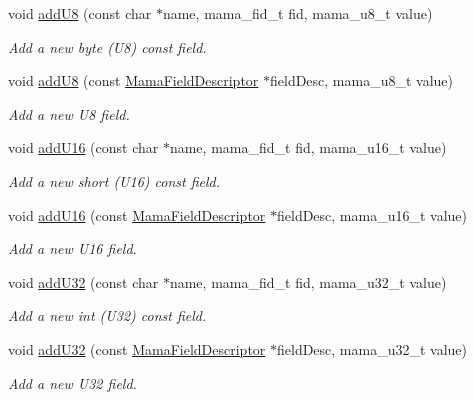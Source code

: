 \begin{DoxyCompactItemize}
void \hyperlink{classWombat_1_1MamaMsg_a931fb98ca16997dd63ecdc4438ff5708}{addU8} (const char $\ast$name, mama\_\-fid\_\-t fid, mama\_\-u8\_\-t value)
\begin{DoxyCompactList}\small\item\em Add a new byte (U8) const field. \item\end{DoxyCompactList}\item 
void \hyperlink{classWombat_1_1MamaMsg_aa3fc0486457904f3b1cc324b24afcc94}{addU8} (const \hyperlink{classWombat_1_1MamaFieldDescriptor}{MamaFieldDescriptor} $\ast$fieldDesc, mama\_\-u8\_\-t value)
\begin{DoxyCompactList}\small\item\em Add a new U8 field. \item\end{DoxyCompactList}\item 
void \hyperlink{classWombat_1_1MamaMsg_a54bc3aa317e0d841b384ff530c471575}{addU16} (const char $\ast$name, mama\_\-fid\_\-t fid, mama\_\-u16\_\-t value)
\begin{DoxyCompactList}\small\item\em Add a new short (U16) const field. \item\end{DoxyCompactList}\item 
void \hyperlink{classWombat_1_1MamaMsg_afba06052159be67eb3196bb97a1d5b5a}{addU16} (const \hyperlink{classWombat_1_1MamaFieldDescriptor}{MamaFieldDescriptor} $\ast$fieldDesc, mama\_\-u16\_\-t value)
\begin{DoxyCompactList}\small\item\em Add a new U16 field. \item\end{DoxyCompactList}\item 
void \hyperlink{classWombat_1_1MamaMsg_ac90ad9badb8741f8d926d82a28415a61}{addU32} (const char $\ast$name, mama\_\-fid\_\-t fid, mama\_\-u32\_\-t value)
\begin{DoxyCompactList}\small\item\em Add a new int (U32) const field. \item\end{DoxyCompactList}\item 
void \hyperlink{classWombat_1_1MamaMsg_ae70a69e4203010eab4026d946a242601}{addU32} (const \hyperlink{classWombat_1_1MamaFieldDescriptor}{MamaFieldDescriptor} $\ast$fieldDesc, mama\_\-u32\_\-t value)
\begin{DoxyCompactList}\small\item\em Add a new U32 field. \item\end{DoxyCompactList}\item 

\end{DoxyCompactItemize}
